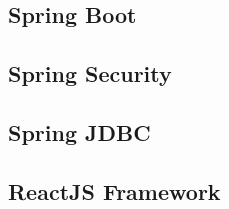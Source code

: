 











\subsection{Spring Boot}
\label{subsection:springBoot}

\subsection{Spring Security}
\label{subsection:proposedSolution}

\subsection{Spring JDBC}
\label{subsection:springJDBC}

\subsection{ReactJS Framework}
\label{section:reactJSFramework}

